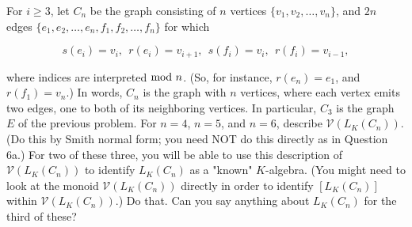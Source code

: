 For $i\geq 3$, let $C_n$ be the graph consisting of $n$ vertices $\{v_1, v_2, \hdots, v_n\}$,  and $2n$
edges $\{e_1, e_2, \hdots, e_n, f_1, f_2, \hdots, f_n\}$ for which 

$$s(e_i) = v_i,  \ \  r(e_i) = v_{i+1}, \ \  s(f_i) = v_i,  \ \ r(f_i) = v_{i-1},$$

where indices are interpreted ${\rm mod } \ n$. (So, for instance, $r(e_n) = e_1$, and $r(f_1) = v_n$.)
In words, $C_n$ is the graph with $n$ vertices, where each vertex emits two edges, one to both of its
neighboring vertices. In particular, $C_3$ is the graph $E$ of the previous problem. For $n=4$, $n=5$,
and $n=6$, describe $\mathcal{V}(L_K(C_n))$. (Do this by Smith normal form; you need NOT do this
directly as in Question 6a.) For two of these three, you will be able to use this description of
$\mathcal{V}(L_K(C_n))$ to identify $L_K(C_n)$ as a "known" $K$-algebra. (You might need to look at the
monoid $\mathcal{V}(L_K(C_n))$ directly in order to identify $[  L_K(C_n) ]$ within 
$\mathcal{V}(L_K(C_n))$.) Do that. Can you say anything about $L_K(C_n)$ for the third of these?\\\\ 

